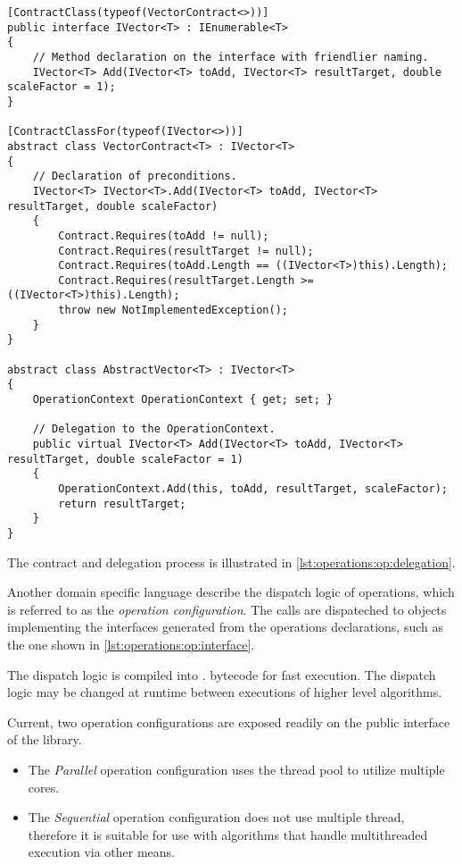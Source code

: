 \begin{lstlisting}[float,caption={Delegation of operations to the
    context (excerpt).},label=lst:operations:op:delegation]
[ContractClass(typeof(VectorContract<>))]
public interface IVector<T> : IEnumerable<T>
{
    // Method declaration on the interface with friendlier naming.
    IVector<T> Add(IVector<T> toAdd, IVector<T> resultTarget, double scaleFactor = 1);
}

[ContractClassFor(typeof(IVector<>))]
abstract class VectorContract<T> : IVector<T>
{
    // Declaration of preconditions.
    IVector<T> IVector<T>.Add(IVector<T> toAdd, IVector<T> resultTarget, double scaleFactor)
    {
        Contract.Requires(toAdd != null);
        Contract.Requires(resultTarget != null);
        Contract.Requires(toAdd.Length == ((IVector<T>)this).Length);
        Contract.Requires(resultTarget.Length >= ((IVector<T>)this).Length);
        throw new NotImplementedException();
    }
}

abstract class AbstractVector<T> : IVector<T>
{
    OperationContext OperationContext { get; set; }

    // Delegation to the OperationContext.
    public virtual IVector<T> Add(IVector<T> toAdd, IVector<T> resultTarget, double scaleFactor = 1)
    {
        OperationContext.Add(this, toAdd, resultTarget, scaleFactor);
        return resultTarget;
    }
}
\end{lstlisting}

The contract and delegation process is illustrated in
\cref{lst:operations:op:delegation}.

Another domain specific language describe the dispatch logic of
operations, which is referred to as the \emph{operation
  configuration}. The calls are dispateched to objects implementing
the interfaces generated from the operations declarations, such as the
one shown in \cref{lst:operations:op:interface}.

The dispatch logic is compiled into .  bytecode
for fast execution. The dispatch logic may be changed at runtime
between executions of higher level algorithms.

Current, two operation configurations are exposed readily on the
public interface of the library.
\begin{itemize}
\item The \emph{Parallel} operation configuration uses the thread pool
  to utilize multiple  cores.
\item The \emph{Sequential} operation configuration does not use
  multiple thread, therefore it is suitable for use with algorithms
  that handle multithreaded execution via other means.
\end{itemize}

